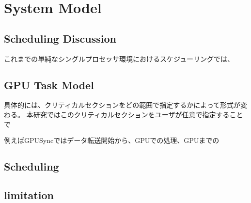 \section{System Model}

\subsection{Scheduling Discussion}

これまでの単純なシングルプロセッサ環境におけるスケジューリングでは、




\subsection{GPU Task Model}
具体的には、クリティカルセクションをどの範囲で指定するかによって形式が変わる。
本研究ではこのクリティカルセクションをユーザが任意で指定することで


例えばGPUSyncではデータ転送開始から、GPUでの処理、GPUまでの

\subsection{Scheduling}

\subsection{limitation}

